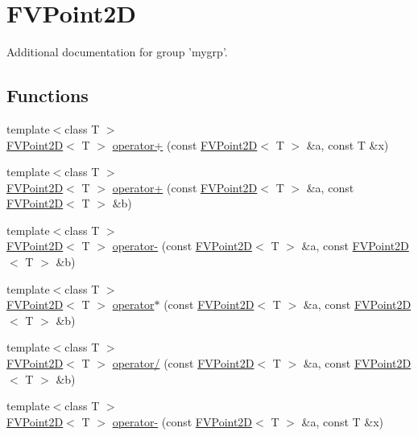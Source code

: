 \hypertarget{group__FVPoint2D}{
\section{FVPoint2D}
\label{d6/d88/group__FVPoint2D}
}


Additional documentation for group 'mygrp'.  


\subsection*{Functions}
\begin{DoxyCompactItemize}
\item 
{\footnotesize template$<$class T $>$ }\\\hyperlink{classFVPoint2D}{FVPoint2D}$<$ T $>$ \hyperlink{group__FVPoint2D_gac45bd75690254ff12861d49e8f099eef}{operator+} (const \hyperlink{classFVPoint2D}{FVPoint2D}$<$ T $>$ \&a, const T \&x)
\item 
{\footnotesize template$<$class T $>$ }\\\hyperlink{classFVPoint2D}{FVPoint2D}$<$ T $>$ \hyperlink{group__FVPoint2D_gaf8f481fb9e7a476e2f5148f01f36a05a}{operator+} (const \hyperlink{classFVPoint2D}{FVPoint2D}$<$ T $>$ \&a, const \hyperlink{classFVPoint2D}{FVPoint2D}$<$ T $>$ \&b)
\item 
{\footnotesize template$<$class T $>$ }\\\hyperlink{classFVPoint2D}{FVPoint2D}$<$ T $>$ \hyperlink{group__FVPoint2D_ga5f264c9cef903053a216a56c65d9249e}{operator-\/} (const \hyperlink{classFVPoint2D}{FVPoint2D}$<$ T $>$ \&a, const \hyperlink{classFVPoint2D}{FVPoint2D}$<$ T $>$ \&b)
\item 
{\footnotesize template$<$class T $>$ }\\\hyperlink{classFVPoint2D}{FVPoint2D}$<$ T $>$ \hyperlink{group__FVPoint2D_ga04bc7e803d73ef330131856d6105c730}{operator$\ast$} (const \hyperlink{classFVPoint2D}{FVPoint2D}$<$ T $>$ \&a, const \hyperlink{classFVPoint2D}{FVPoint2D}$<$ T $>$ \&b)
\item 
{\footnotesize template$<$class T $>$ }\\\hyperlink{classFVPoint2D}{FVPoint2D}$<$ T $>$ \hyperlink{group__FVPoint2D_ga7cf0bdae41a03ea052321be2e9d71692}{operator/} (const \hyperlink{classFVPoint2D}{FVPoint2D}$<$ T $>$ \&a, const \hyperlink{classFVPoint2D}{FVPoint2D}$<$ T $>$ \&b)
\item 
{\footnotesize template$<$class T $>$ }\\\hyperlink{classFVPoint2D}{FVPoint2D}$<$ T $>$ \hyperlink{group__FVPoint2D_gafe243e86f8ce7b530db3cb29b5eb5445}{operator-\/} (const \hyperlink{classFVPoint2D}{FVPoint2D}$<$ T $>$ \&a, const T \&x)

\end{DoxyCompactItemize}
